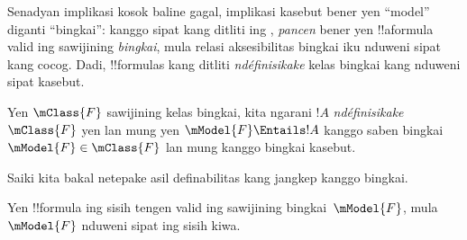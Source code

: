 \documentclass[../../../include/open-logic-section]{subfiles}
\begin{document}


Senadyan implikasi kosok baline 
gagal, implikasi kasebut bener yen ``model'' diganti ``bingkai'':
kanggo sipat kang ditliti ing ,
\emph{pancen} bener yen !!a{formula} valid ing sawijining
\emph{bingkai}, mula relasi aksesibilitas bingkai iku nduweni sipat
kang cocog. Dadi, !!{formula}s kang ditliti \emph{ndéfinisikake}
kelas bingkai kang nduweni sipat kasebut.

\begin{defn}
  Yen $\mClass{F}$ sawijining kelas bingkai, kita ngarani $!A$
  \emph{ndéfinisikake}~$\mClass{F}$ yen lan mung yen $\mModel{F} \Entails !A$
  kanggo saben bingkai~$\mModel{F} \in \mClass{F}$ lan mung kanggo
  bingkai kasebut.
\end{defn}

Saiki kita bakal netepake asil definabilitas kang jangkep
kanggo bingkai.

\begin{thm}
Yen !!{formula} ing sisih tengen  valid ing sawijining
bingkai~$\mModel{F}$, mula $\mModel{F}$ nduweni sipat ing sisih kiwa.
\end{thm}
\end{document}
